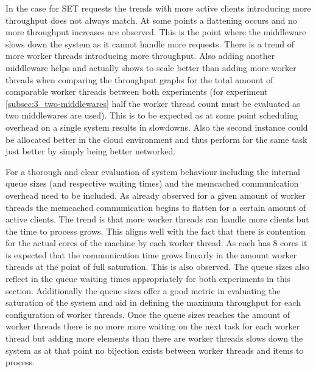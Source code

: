         In the case for SET requests the trends with more active clients introducing more throughput does not always
        match. At some points a flattening occurs and no more throughput increases are observed. This is the point
        where the middleware slows down the system as it cannot handle more requests. There is a trend of more worker
        threads introducing more throughput. Also adding another middleware helps and actually shows to scale better
        than adding more worker threads when comparing the throughput graphs for the total amount of comparable worker
        threads between both experiments (for experiment \ref{subsec:3_two-middlewares} half the worker thread count
        must be evaluated as two middlewares are used). This is to be expected as at some point scheduling overhead on a
        single system results in slowdowns. Also the second instance could be allocated better in the cloud environment
        and thus perform for the same task just better by simply being better networked.

        For a thorough and clear evaluation of system behaviour including the internal queue sizes (and respective
        waiting times) and the memcached communication overhead need to be included.\newline
        As already observed for a given amount of worker threads the memcached communication begins to flatten for a
        certain amount of active clients. The trend is that more worker threads can handle more clients but the time to
        process grows. This aligns well with the fact that there is contention for the actual cores of the machine by
        each worker thread. As each \mw{} has 8 cores it is expected that the communication time grows linearly in the
        amount worker threads at the point of full saturation. This is also observed. The queue sizes also reflect in
        the queue waiting times appropriately for both experiments in this section. Additionally the queue sizes offer a
        good metric in evaluating the saturation of the system and aid in defining the maximum throughput for each
        configuration of worker threads. Once the queue sizes reaches the amount of worker threads there is no more more
        waiting on the next task for each worker thread but adding more elements than there are worker threads slows
        down the system as at that point no bijection exists between worker threads and items to process.

